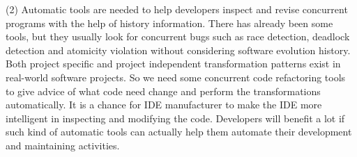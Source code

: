 (2) Automatic tools are needed to help developers inspect and revise concurrent programs with the help of history information. There has already been some tools, but they usually look for concurrent bugs such as race detection, deadlock detection and atomicity violation without considering software evolution history. Both project specific and project independent transformation patterns exist in real-world software projects. So we need some concurrent code refactoring tools to give advice of what code need change and perform the transformations automatically. It is a chance for IDE manufacturer to make the IDE more intelligent in inspecting and modifying the code. Developers will benefit a lot if such kind of automatic tools can actually help them automate their development and maintaining activities.
